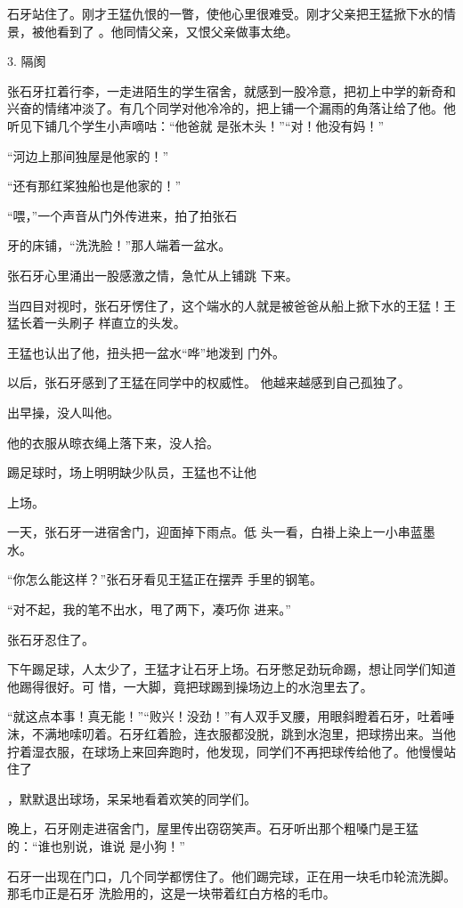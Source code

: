 \documentclass{article}
\begin{document}
石牙站住了。刚才王猛仇恨的一瞥，使他心里很难受。刚才父亲把王猛掀下水的情景，被他看到了
。他同情父亲，又恨父亲做事太绝。 


3. 隔阂 

张石牙扛着行李，一走进陌生的学生宿舍，就感到一股冷意，把初上中学的新奇和兴奋的情绪冲淡了。有几个同学对他冷冷的，把上铺一个漏雨的角落让给了他。他听见下铺几个学生小声嘀咕：“他爸就
是张木头！”“对！他没有妈！” 


“河边上那间独屋是他家的！” 


“还有那红桨独船也是他家的！” 

“喂，”一个声音从门外传进来，拍了拍张石
\newpage

牙的床铺，“洗洗脸！”那人端着一盆水。 

张石牙心里涌出一股感激之情，急忙从上铺跳
下来。 

当四目对视时，张石牙愣住了，这个端水的人就是被爸爸从船上掀下水的王猛！王猛长着一头刷子
样直立的头发。 

王猛也认出了他，扭头把一盆水“哗”地泼到
门外。 

以后，张石牙感到了王猛在同学中的权威性。
他越来越感到自己孤独了。 


出早操，没人叫他。 


他的衣服从晾衣绳上落下来，没人拾。 

踢足球时，场上明明缺少队员，王猛也不让他

\newpage
上场。 

一天，张石牙一进宿舍门，迎面掉下雨点。低
头一看，白褂上染上一小串蓝墨水。 

“你怎么能这样？”张石牙看见王猛正在摆弄
手里的钢笔。 

“对不起，我的笔不出水，甩了两下，凑巧你
进来。” 


张石牙忍住了。 

下午踢足球，人太少了，王猛才让石牙上场。石牙憋足劲玩命踢，想让同学们知道他踢得很好。可
惜，一大脚，竟把球踢到操场边上的水泡里去了。 

“就这点本事！真无能！”“败兴！没劲！”有人双手叉腰，用眼斜瞪着石牙，吐着唾沫，不满地嗦叨着。石牙红着脸，连衣服都没脱，跳到水泡里，把球捞出来。当他拧着湿衣服，在球场上来回奔跑时，他发现，同学们不再把球传给他了。他慢慢站住了
\newpage

，默默退出球场，呆呆地看着欢笑的同学们。 

晚上，石牙刚走进宿舍门，屋里传出窃窃笑声。石牙听出那个粗嗓门是王猛的：“谁也别说，谁说
是小狗！” 

石牙一出现在门口，几个同学都愣住了。他们踢完球，正在用一块毛巾轮流洗脚。那毛巾正是石牙
洗脸用的，这是一块带着红白方格的毛巾。 
\end{document}
